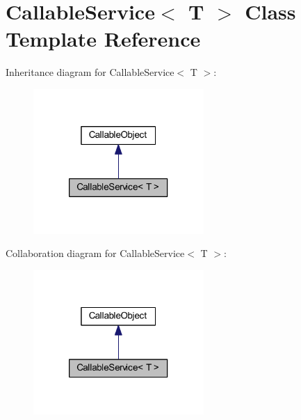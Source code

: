 \hypertarget{class_callable_service}{
\section{CallableService$<$ T $>$ Class Template Reference}
\label{class_callable_service}
}


Inheritance diagram for CallableService$<$ T $>$:\nopagebreak
\begin{figure}[H]
\begin{center}
\leavevmode
\includegraphics[width=184pt]{class_callable_service__inherit__graph}
\end{center}
\end{figure}


Collaboration diagram for CallableService$<$ T $>$:\nopagebreak
\begin{figure}[H]
\begin{center}
\leavevmode
\includegraphics[width=184pt]{class_callable_service__coll__graph}
\end{center}
\end{figure}
